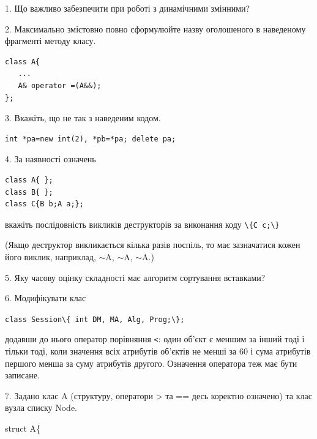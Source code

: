 \documentclass[12pt, ukrainian]{article}
\def\code#1{\Verb!#1!}
\begin{document}
{%
1. Що важливо забезпечити при роботі з динамічними змінними?%
\par
\vspace{2mm}
2. Максимально змістовно повно сформулюйте назву оголошеного в наведеному фрагменті методу класу.
\vspace{-3mm}
\begin{verbatim}class A{
   ...
   A& operator =(A&&);
};\end{verbatim}
\vspace{-3mm}
\par
\vspace{2mm}
3. Вкажіть, що не так з наведеним кодом.
\vspace{-3mm}
\begin{verbatim}int *pa=new int(2), *pb=*pa; delete pa;\end{verbatim}
\vspace{-3mm}
\par
\vspace{2mm}
4. За наявності означень
\vspace{-3mm}
\begin{verbatim}
class A{ };
class B{ };
class C{B b;A a;};\end{verbatim}
\vspace{-3mm}
вкажіть послідовність викликів деструкторів за виконання коду \code{\{C c;\}} 

(Якщо деструктор викликається кілька разів поспіль, то має зазначатися кожен його виклик, наприклад, $\sim$A, $\sim$A, $\sim$A.)

\vspace{2mm}
5. Яку часову оцінку складності має алгоритм сортування вставками?
\par
\vspace{2mm}
6. Модифікувати клас 

\qquad\code{class Session\{ int DM, MA, Alg, Prog;\};} 


додавши до нього оператор порівняння \code{<}: один об'єкт є меншим за інший тоді і тільки тоді, коли значення всіх атрибутів об'єктів не менші за 60 і сума атрибутів першого менша за суму атрибутів другого. Означення оператора теж має бути записане.%
\par
\vspace{2mm}
7. 
Задано клас A (структуру, оператори > та == десь коректно означено) та клас вузла списку Node.

struct A\{

}
\end{document}
